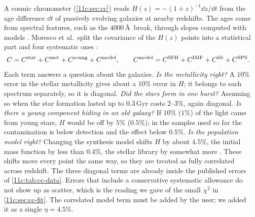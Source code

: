 A cosmic chronometer (\cref{11c:sec:cc}) reads $H(z)=-(1+z)^{-1}\dd z/\dd t$ from the
age difference $\dd t$ of passively evolving galaxies at nearby redshifts. The ages
come from spectral features, such as the $4000$\,\AA\ break, through slopes computed
with  models . Moresco
et al.\ split the covariance of the $H(z)$ points into a statistical part and four
systematic ones \cite[Sec.~3.1.4, eqs.~(19)--(21)]{Moresco2022}:
\begin{equation}
  C=C^{\rm stat}+C^{\rm met}+C^{\rm young}+C^{\rm model},
  \qquad
  C^{\rm model}=C^{\rm SFH}+C^{\rm IMF}+C^{\rm lib}+C^{\rm SPS}.
  \label{11c:eq:cc-budget}
\end{equation}
Each term answers a question about the galaxies. \emph{Is the metallicity right?} A
$10\%$ error in the stellar metallicity gives about a $10\%$ error in $H$; it belongs
to each spectrum separately, so it is diagonal. \emph{Did the stars form in one burst?}
Assuming so when the star formation lasted up to $0.3$\,Gyr costs $2$--$3\%$, again
diagonal. \emph{Is there a young component hiding in an old galaxy?} If $10\%$ ($1\%$)
of the light came from young stars, $H$ would be off by $5\%$ ($0.5\%$); in the samples
used so far the contamination is below detection and the effect below $0.5\%$.
\emph{Is the population model right?} Changing the synthesis model shifts $H$ by about
$4.5\%$, the initial mass function by less than $0.4\%$, the stellar library by
somewhat more \cite{Moresco2020}. These shifts move every point the same way, so they
are treated as fully correlated across redshift. The three diagonal terms are already
inside the published errors of \cref{11c:tab:cc-data}. Errors that include a
conservative systematic allowance do not show up as scatter, which is the reading we gave of
the small $\chi^2$ in \cref{11c:sec:cc-fit}. The correlated model term must be added by
the user; we added it as a single $\eta=4.5\%$.

